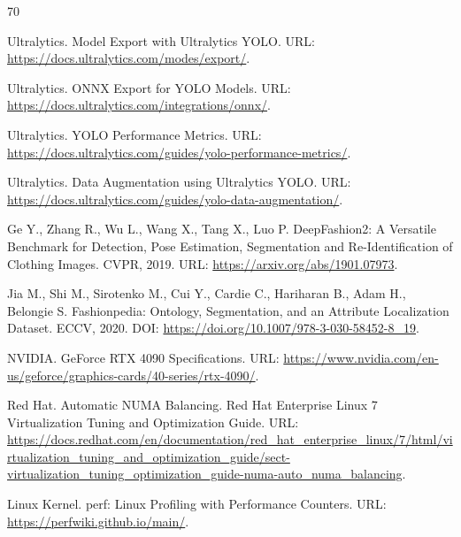 \documentclass[12pt,a4paper,oneside,openany]{report}
\begin{document}
\begin{thebibliography}{70}

Ultralytics.
Model Export with Ultralytics YOLO.
URL: \url{https://docs.ultralytics.com/modes/export/}.

Ultralytics.
ONNX Export for YOLO Models.
URL: \url{https://docs.ultralytics.com/integrations/onnx/}.

Ultralytics.
YOLO Performance Metrics.
URL: \url{https://docs.ultralytics.com/guides/yolo-performance-metrics/}.

Ultralytics.
Data Augmentation using Ultralytics YOLO.
URL: \url{https://docs.ultralytics.com/guides/yolo-data-augmentation/}.


Ge Y., Zhang R., Wu L., Wang X., Tang X., Luo P.
DeepFashion2: A Versatile Benchmark for Detection, Pose Estimation, Segmentation and Re-Identification of Clothing Images.
CVPR, 2019.
URL: \url{https://arxiv.org/abs/1901.07973}.

Jia M., Shi M., Sirotenko M., Cui Y., Cardie C., Hariharan B., Adam H., Belongie S.
Fashionpedia: Ontology, Segmentation, and an Attribute Localization Dataset.
ECCV, 2020.
DOI: \url{https://doi.org/10.1007/978-3-030-58452-8_19}.


NVIDIA.
GeForce RTX 4090 Specifications.
URL: \url{https://www.nvidia.com/en-us/geforce/graphics-cards/40-series/rtx-4090/}.

Red Hat.
Automatic NUMA Balancing.
Red Hat Enterprise Linux 7 Virtualization Tuning and Optimization Guide.
URL: \url{https://docs.redhat.com/en/documentation/red_hat_enterprise_linux/7/html/virtualization_tuning_and_optimization_guide/sect-virtualization_tuning_optimization_guide-numa-auto_numa_balancing}.

Linux Kernel.
perf: Linux Profiling with Performance Counters.
URL: \url{https://perfwiki.github.io/main/}.


\end{thebibliography}
\end{document}
